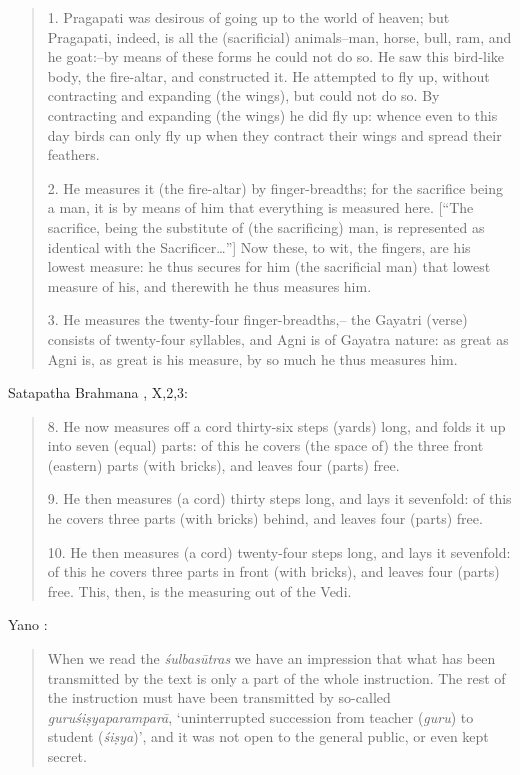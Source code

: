 \documentclass{article}
\begin{document}
\begin{quote}
1. Pragapati was desirous of going up to the
world of heaven; but Pragapati, indeed, is all the
(sacrificial) animals--man, horse, bull, ram, and
he goat:--by means of these forms he could not
do so. He saw this bird-like body, the fire-altar,
and constructed it. He attempted to fly up, without
contracting and expanding (the wings), but could
not do so. By contracting and expanding (the wings)
he did fly up: whence even to this day birds
can only fly up when they contract their wings and
spread their feathers.

2. He measures it (the fire-altar) by finger-breadths;
for the sacrifice being a man, it is by
means of him that everything is measured here. [``The sacrifice, being the substitute of (the sacrificing) man, is represented
as identical with the Sacrificer\ldots'']
Now these, to wit, the fingers, are his lowest
measure: he thus secures for him (the sacrificial
man) that lowest measure of his, and therewith
he thus measures him.

3. He measures the twenty-four finger-breadths,--
the Gayatri (verse) consists of twenty-four syllables,
and Agni is of Gayatra nature: as great as Agni
is, as great is his measure, by so much he thus
measures him.
\end{quote}

Satapatha Brahmana \cite[pp.~310--311]{eggelingIV}, X,2,3:

\begin{quote}
8. He now measures off a cord thirty-six steps
(yards) long, and folds it up into seven (equal) parts:
of this he covers (the space of) the three front
(eastern) parts (with bricks), and leaves four (parts)
free.

9. He then measures (a cord) thirty steps long,
and lays it sevenfold: of this he covers three parts
(with bricks) behind, and leaves four (parts) free.

10. He then measures (a cord) twenty-four steps
long, and lays it sevenfold: of this he covers three
parts in front (with bricks), and leaves four (parts)
free. This, then, is the measuring out of the Vedi.
\end{quote}

Yano \cite[pp.~145--146]{yano}:

\begin{quote}
When we read the {\em \'sulbas\=utras} we have an impression that what has
been transmitted by the text is only a part of the whole instruction.
The rest of the instruction must have been transmitted by so-called
{\em guru\'si\d{s}yaparampar\=a}, `uninterrupted succession from teacher ({\em guru}) to
student ({\em \'si\d{s}ya})', and it was not open to the general public, or even
kept secret.
\end{quote}
\end{document}
